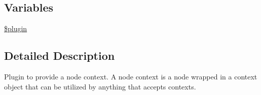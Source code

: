 \subsection*{Variables}
\begin{DoxyCompactItemize}
\item 
\hyperlink{ctools_2views__content_2plugins_2contexts_2view_8inc_ada8a7130088351710bb02ed622d6bf65}{\$plugin}
\end{DoxyCompactItemize}


\subsection{Detailed Description}
Plugin to provide a node context. A node context is a node wrapped in a context object that can be utilized by anything that accepts contexts. 

